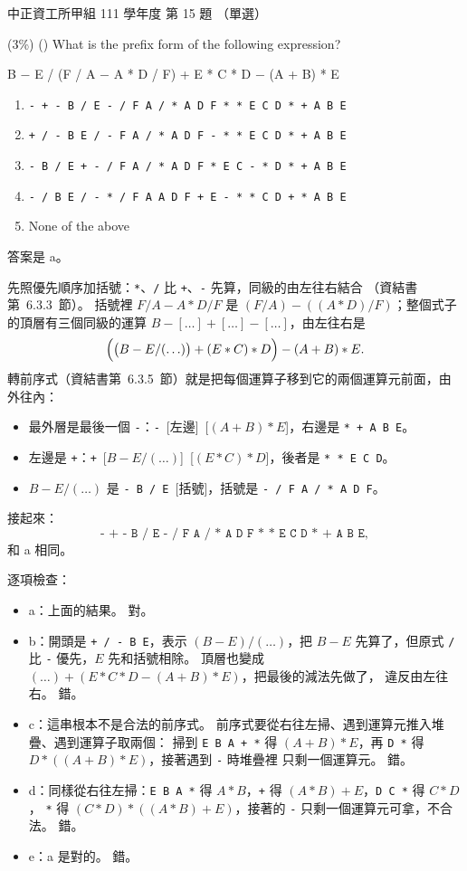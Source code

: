 \begin{pastexam}[label={px:ccu-111-swa-07}]{中正資工所甲組 111 學年度 第 15 題}
（單選）

(3\%) (\quad) What is the prefix form of the following expression?
\begin{center}B $-$ E / (F / A $-$ A * D / F) + E * C * D $-$ (A + B) * E\end{center}
\begin{enumerate}[label=\alph*.,itemsep=0pt,topsep=2pt]
\item \texttt{- + - B / E - / F A / * A D F * * E C D * + A B E}
\item \texttt{+ / - B E / - F A / * A D F - * * E C D * + A B E}
\item \texttt{- B / E + - / F A / * A D F * E C - * D * + A B E}
\item \texttt{- / B E / - * / F A A D F + E - * * C D + * A B E}
\item None of the above
\end{enumerate}
\end{pastexam}

\begin{pastsoln}
答案是 a。

先照優先順序加括號：\texttt{*}、\texttt{/} 比 \texttt{+}、\texttt{-} 先算，同級的由左往右結合
（資結書第~6.3.3~節）。 括號裡 $F/A - A*D/F$ 是 $(F/A) - ((A*D)/F)$；整個式子的頂層有三個同級的運算
$B - [\ldots] + [\ldots] - [\ldots]$，由左往右是
\[
\Bigl( \bigl( B - E/(\ldots) \bigr) + (E*C)*D \Bigr) - (A + B)*E .
\]
轉前序式（資結書第~6.3.5~節）就是把每個運算子移到它的兩個運算元前面，由外往內：
\begin{itemize}
\item 最外層是最後一個 \texttt{-}：\texttt{-}\ [左邊]\ [$(A+B)*E$]，右邊是 \texttt{* + A B E}。
\item 左邊是 \texttt{+}：\texttt{+}\ [$B - E/(\ldots)$]\ [$(E*C)*D$]，後者是 \texttt{* * E C D}。
\item $B - E/(\ldots)$ 是 \texttt{- B / E}\ [括號]，括號是 \texttt{- / F A / * A D F}。
\end{itemize}
接起來：
\[
\texttt{- + - B / E - / F A / * A D F * * E C D * + A B E},
\]
和 a 相同。

逐項檢查：
\begin{itemize}
\item a：上面的結果。 對。
\item b：開頭是 \texttt{+ / - B E}，表示 $(B - E) / (\ldots)$，把 $B - E$ 先算了，但原式 \texttt{/} 比
\texttt{-} 優先，$E$ 先和括號相除。 頂層也變成 $(\ldots) + (E*C*D - (A+B)*E)$，把最後的減法先做了，
違反由左往右。 錯。
\item c：這串根本不是合法的前序式。 前序式要從右往左掃、遇到運算元推入堆疊、遇到運算子取兩個：
掃到 \texttt{E B A + *} 得 $(A+B)*E$，再 \texttt{D *} 得 $D*((A+B)*E)$，接著遇到 \texttt{-} 時堆疊裡
只剩一個運算元。 錯。
\item d：同樣從右往左掃：\texttt{E B A *} 得 $A*B$，\texttt{+} 得 $(A*B)+E$，\texttt{D C *} 得 $C*D$，
\texttt{*} 得 $(C*D)*((A*B)+E)$，接著的 \texttt{-} 只剩一個運算元可拿，不合法。 錯。
\item e：a 是對的。 錯。
\end{itemize}
\end{pastsoln}
